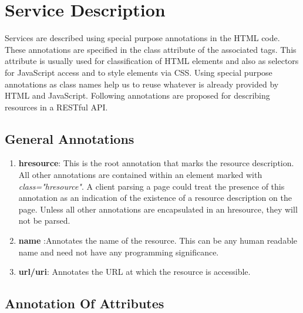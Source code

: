 \documentclass[journal]{IEEEtran}
\begin{document}
\section{Service Description}
\label{sec:ServiceDescription}
Services are described using special purpose annotations in the HTML code. These annotations are specified in the class attribute of the associated tags. This attribute is usually used for classification of HTML elements and also as selectors for JavaScript access and to style elements via CSS. Using special purpose annotations as class names help us to reuse whatever is already provided by HTML and JavaScript. Following annotations are proposed for describing resources in a RESTful API.

\subsection{General Annotations}
\begin{enumerate}

\item {\bf hresource}: This is the root annotation that marks the resource description. All other annotations are contained within an element marked with {\it class="hresource"}. A client parsing a page could treat the presence of this annotation as an indication of the existence of a resource description on the page. Unless all other annotations are encapsulated in an hresource, they will not be parsed.

\item {\bf name} :Annotates the name of the resource. This can be any human readable name and need not have any programming significance.

\item {\bf url/uri}: Annotates the URL at which the resource is accessible.
\end{enumerate}

\subsection{Annotation Of Attributes}
\end{document}
